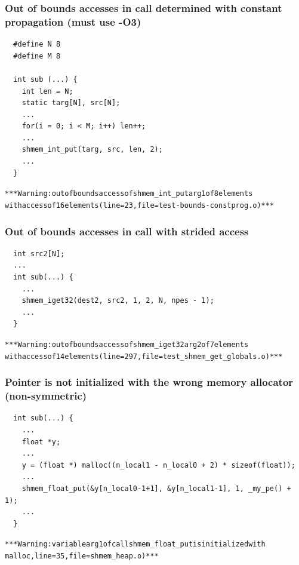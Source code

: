 \subsubsection{Out of bounds accesses in \openshmem call determined with constant propagation (must use -O3)}

\begin{lstlisting}
  #define N 8
  #define M 8

  int sub (...) {
    int len = N;
    static targ[N], src[N];
    ...
    for(i = 0; i < M; i++) len++;
    ...
    shmem_int_put(targ, src, len, 2);
    ...
  }     
\end{lstlisting}
\begin{alltt}
  *** \openshmem Warning: out of bounds access of shmem_int_put arg1 of 8 elements 
  with access of 16 elements (line=23, file=test-bounds-constprog.o) ***
\end{alltt}

\subsubsection{Out of bounds accesses in \openshmem call with strided access}

\begin{lstlisting}
  int src2[N];
  ...
  int sub(...) {
    ...
    shmem_iget32(dest2, src2, 1, 2, N, npes - 1);
    ...
  }
\end{lstlisting}
\begin{alltt}
  *** \openshmem Warning: out of bounds access of shmem_iget32 arg2 of 7 elements 
  with access of 14 elements (line=297, file=test_shmem_get_globals.o) ***
\end{alltt}

\subsubsection{Pointer is not initialized with the wrong memory allocator (non-symmetric)}

\begin{lstlisting}
  int sub(...) {
    ...
    float *y;
    ...
    y = (float *) malloc((n_local1 - n_local0 + 2) * sizeof(float));
    ...
    shmem_float_put(&y[n_local0-1+1], &y[n_local1-1], 1, _my_pe() + 1);
    ...
  } 
\end{lstlisting}
\begin{alltt}
  *** \openshmem Warning: variable arg1 of call shmem_float_put is initialized with 
  malloc, line=35, file=shmem\_heap.o) ***
\end{alltt}

